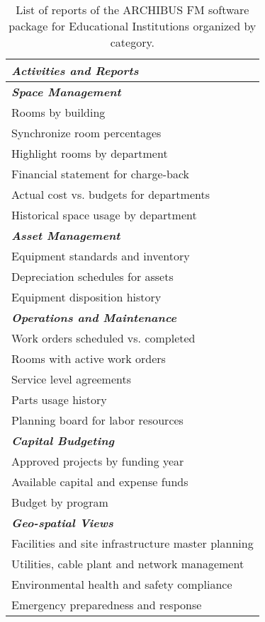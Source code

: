 \begin{table}[h!]
	\begin{adjustwidth}{3cm}{0cm}
	\begin{tabular}{l}
		\hline
		{\bf {\emph{Activities and Reports}}} \\
		\hline
		{\bf {\emph{Space Management}}}\\
		Rooms by building \\
		Synchronize room percentages \\
		Highlight rooms by department \\ 
		Financial statement for charge-back \\ 
		Actual cost vs. budgets for departments \\ 
		Historical space usage by department \\ 
		\hline

		{\bf {\emph{Asset Management}}}\\
		Equipment standards and inventory  \\
		Depreciation schedules for assets \\
		Equipment disposition history \\ 
		\hline

		{\bf {\emph{Operations and Maintenance}}}\\
		Work orders scheduled vs. completed \\
		Rooms with active work orders \\
		Service level agreements \\ 
		Parts usage history \\ 
		Planning board for labor resources \\ 
		\hline

		{\bf {\emph{Capital Budgeting}}}\\
		Approved projects by funding year\\
		Available capital and expense funds \\
		Budget by program \\ 
		\hline

		{\bf {\emph{Geo-spatial Views}}}\\
		Facilities and site infrastructure master planning \\
		Utilities, cable plant and network management \\
		Environmental health and safety compliance \\ 
		Emergency preparedness and response \\ 
		\hline


	\end{tabular}
	\end{adjustwidth}
\caption{List of reports of the ARCHIBUS FM \cite{ARCHI} software package for Educational Institutions organized by category.}
\label{tb:ARCHIBUSListActReports}
\end{table}


